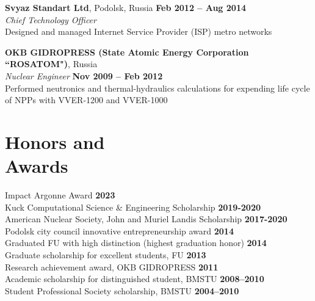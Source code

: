 \documentclass[margin,line]{resume}
\begin{document}
\begin{resume}
    \textbf{Svyaz Standart Ltd}, Podolsk, Russia \hfill \textbf{Feb 2012 -- Aug 2014}\\
		\textsl{Chief Technology Officer}\\
		Designed and managed Internet Service Provider (ISP) metro networks

    \textbf{OKB GIDROPRESS (State Atomic Energy Corporation ``ROSATOM")}, 
    Russia\\
		\textsl{Nuclear Engineer}  \hfill \textbf{Nov 2009 -- Feb 2012} \\
        Performed neutronics and thermal-hydraulics calculations for expending 
				life cycle of NPPs with VVER-1200 and VVER-1000

	\section{\mysidestyle Honors and\\Awards}
	Impact Argonne Award\hfill 
	\textbf{2023}\vspace{.5mm}\\%
	Kuck Computational Science \& Engineering Scholarship\hfill 
	\textbf{2019-2020}\vspace{.5mm}\\%
	American Nuclear Society, John and Muriel Landis Scholarship\hfill 
	\textbf{2017-2020}\vspace{.5mm}\\%
	Podolsk city council innovative entrepreneurship award\hfill 
	\textbf{2014}\vspace{.5mm}\\%
	Graduated FU with high distinction (highest graduation 
	honor)                \hfill \textbf{2014}\vspace{.5mm}\\%
	Graduate scholarship for excellent students, 
	FU                       	\hfill \textbf{2013}\vspace{.5mm}\\%
	Research achievement award, OKB 
	GIDROPRESS                                   
	\hfill\textbf{2011}\vspace{.5mm}\\%
	Academic scholarship for distinguished student, 
	BMSTU		                 \hfill\textbf{2008--2010}\vspace{.5mm}\\%
	Student Professional Society scholarship, 
	BMSTU                                \hfill\textbf{2004--2010}%

\end{resume}
\end{document}

